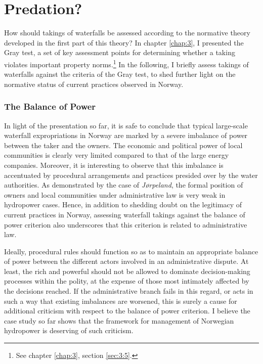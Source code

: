 \section{Predation?}\label{sec:5:7}

How should takings of waterfalls be assessed according to the normative theory developed in the first part of this theory? In chapter \ref{chap:3}, I presented the Gray test, a set of key assessment points for determining whether a taking violates important property norms.\footnote{See chapter \ref{chap:3}, section \ref{sec:3:5}.} In the following, I briefly assess takings of waterfalls against the criteria of the Gray test, to shed further light on the normative status of current practices observed in Norway.

\subsubsection{The Balance of Power}\label{sec:5:7:1}

In light of the presentation so far, it is safe to conclude that typical large-scale waterfall expropriations in Norway are marked by a severe imbalance of power between the taker and the owners. The economic and political power of local communities is clearly very limited compared to that of the large energy companies. Moreover, it is interesting to observe that this imbalance is accentuated by procedural arrangements and practices presided over by the water authorities. As demonstrated by the case of {\it Jørpeland}, the formal position of owners and local communities under administrative law is very weak in hydropower cases. Hence, in addition to shedding doubt on the legitimacy of current practices in Norway, assessing waterfall takings against the balance of power criterion also underscores that this criterion is related to administrative law.

Ideally, procedural rules should function so as to maintain an appropriate balance of power between the different actors involved in an administrative dispute. At least, the rich and powerful should not be allowed to dominate decision-making processes within the polity, at the expense of those most intimately affected by the decisions reached. If the administrative branch fails in this regard, or acts in such a way that existing imbalances are worsened, this is surely a cause for additional criticism with respect to the balance of power criterion. I believe the case study so far shows that the framework for management of Norwegian hydropower is deserving of such criticism.

